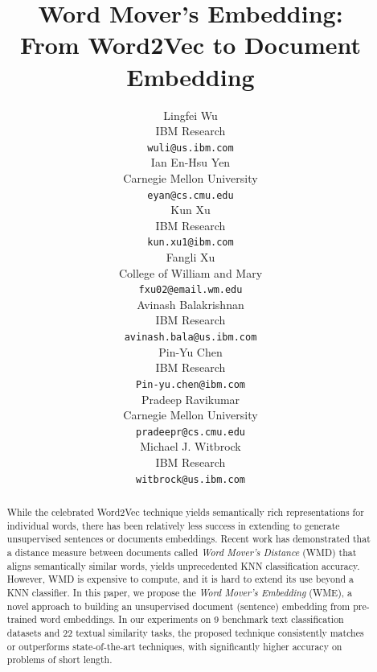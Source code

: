 \documentclass[11pt,a4paper]{article}
\title{Word Mover's Embedding: \\From Word2Vec to Document Embedding}
\author{
  Lingfei Wu \\
  IBM Research\\
  \texttt{wuli@us.ibm.com} \\
  \And
  Ian En-Hsu Yen  \\
  Carnegie Mellon University \\
  \texttt{eyan@cs.cmu.edu} \\
  \And
  Kun Xu \\
  IBM Research\\
  \texttt{kun.xu1@ibm.com} \\
  \AND
  Fangli Xu \\
  College of William and Mary \\
  \texttt{fxu02@email.wm.edu} \\
  \And
  Avinash Balakrishnan \\
  IBM Research\\
  \texttt{avinash.bala@us.ibm.com} \\
  \And
  Pin-Yu Chen \\
  IBM Research \\
  \texttt{Pin-yu.chen@ibm.com} \\
  \AND
  Pradeep Ravikumar \\
  Carnegie Mellon University \\
  \texttt{pradeepr@cs.cmu.edu} \\
  \And
  Michael J. Witbrock \\
  IBM Research\\
  \texttt{witbrock@us.ibm.com} \\
}
\date{}
\newcommand{\1}{\boldsymbol{1}}
\begin{document}
\maketitle

\begin{abstract}
While the celebrated Word2Vec technique yields semantically rich representations for individual words, there has been relatively less success in extending to generate unsupervised sentences or documents embeddings. Recent work has demonstrated that a distance measure between documents called \emph{Word Mover's Distance} (WMD) that aligns semantically similar words, yields unprecedented KNN classification accuracy. However, WMD is expensive to compute, and it is hard to extend its use beyond a KNN classifier. In this paper, we propose the \emph{Word Mover's Embedding } (WME), a novel approach to building an unsupervised document (sentence) embedding from pre-trained word embeddings. 
In our experiments on 9 benchmark text classification datasets and 22 textual similarity tasks, the proposed technique consistently matches or outperforms state-of-the-art techniques, with significantly higher accuracy on problems of short length.




\end{abstract}
\end{document}
